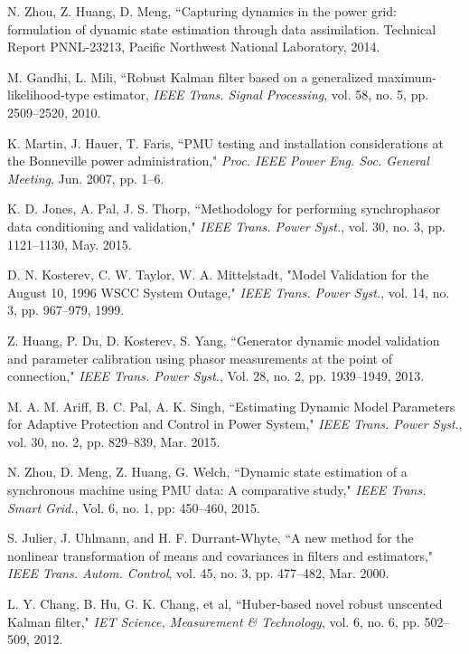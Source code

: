 \documentclass[10pt]{IEEEtran}
\begin{document}
\begin{thebibliography}{99}
N. Zhou, Z. Huang, D. Meng, ``Capturing dynamics in the power grid: formulation of dynamic state estimation through data assimilation. Technical Report PNNL-23213, Pacific Northwest National Laboratory, 2014.

M. Gandhi, L. Mili, ``Robust Kalman filter based on a generalized maximum-likelihood-type estimator, \emph{IEEE Trans. Signal Processing}, vol. 58, no. 5, pp. 2509--2520, 2010.

K. Martin, J. Hauer, T. Faris, ``PMU testing and installation considerations at the Bonneville power administration," \emph{Proc. IEEE Power Eng. Soc. General Meeting}, Jun. 2007, pp. 1--6.

K. D. Jones, A. Pal, J. S. Thorp,  ``Methodology for performing synchrophasor data conditioning and validation," \emph{IEEE Trans. Power Syst.}, vol. 30, no. 3, pp. 1121--1130, May. 2015.

D. N. Kosterev, C. W. Taylor, W. A. Mittelstadt, "Model Validation for the August 10, 1996 WSCC System Outage," \emph{IEEE Trans. Power Syst.}, vol. 14, no. 3, pp. 967--979, 1999.

Z. Huang, P. Du, D. Kosterev, S. Yang, ``Generator dynamic model validation and parameter calibration using phasor measurements at the point of connection," \emph{IEEE Trans. Power Syst.}, Vol. 28, no. 2, pp. 1939--1949, 2013.

M. A. M. Ariff, B. C. Pal, A. K. Singh, ``Estimating Dynamic Model Parameters for Adaptive Protection and Control in Power System," \emph{IEEE Trans. Power Syst}., vol. 30, no. 2, pp. 829--839, Mar. 2015.

N. Zhou, D. Meng, Z. Huang, G. Welch, ``Dynamic state estimation of a synchronous machine using PMU data: A comparative study," \emph{IEEE Trans. Smart Grid.}, Vol. 6, no. 1, pp: 450--460, 2015.

S. Julier, J. Uhlmann, and H. F. Durrant-Whyte, ``A new method for the nonlinear transformation of means and covariances in filters and estimators," \emph{IEEE Trans. Autom. Control}, vol. 45, no. 3, pp. 477--482, Mar. 2000.


L. Y. Chang, B. Hu, G. K. Chang, et al, ``Huber-based novel robust unscented Kalman filter," \emph{IET Science, Measurement \& Technology}, vol. 6, no. 6, pp. 502--509, 2012.


\end{thebibliography}
\end{document}

